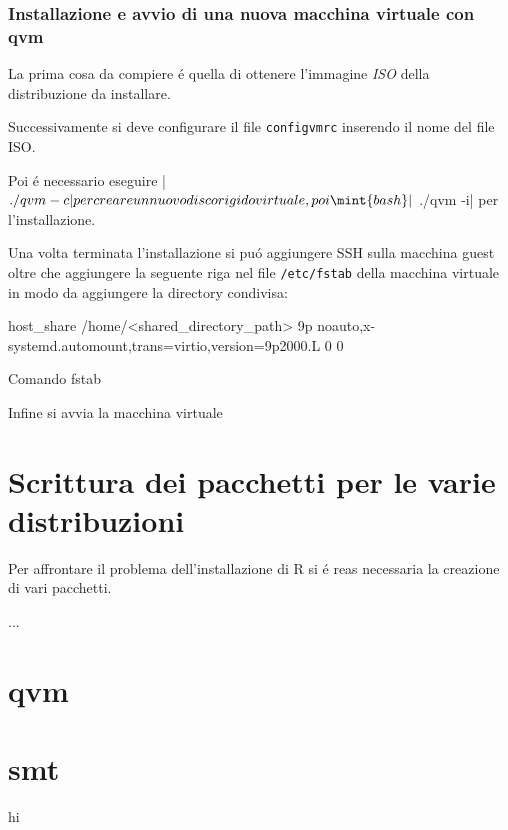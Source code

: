 \documentclass[10pt,titlepage,twoside,a4paper]{report}
\begin{document}
\subsection{Installazione e avvio di una nuova macchina virtuale con qvm}
La prima cosa da compiere \'e quella di ottenere l'immagine \emph{ISO} della 
distribuzione da installare.

Successivamente si deve configurare il file \texttt{configvmrc} inserendo il 
nome del file ISO.

Poi \'e necessario eseguire |$ ./qvm -c| per creare un nuovo 
disco rigido virtuale, poi \mint{bash}|$ ./qvm -i| per l'installazione.

Una volta terminata l'installazione si pu\'o aggiungere SSH sulla macchina 
guest oltre che aggiungere la seguente riga nel file \texttt{/etc/fstab} della 
macchina virtuale in modo da aggiungere la directory condivisa:

\begin{listing}[H]
\begin{textcode*}{}
host_share /home/<shared_directory_path> 9p noauto,x-systemd.automount,trans=virtio,version=9p2000.L 0 0
\end{textcode*}
\caption{Comando fstab}
\end{listing}

Infine si avvia la macchina virtuale

\chapter{Scrittura dei pacchetti per le varie distribuzioni} \label{Scrittura 
dei pacchetti per le varie distribuzioni}
Per affrontare il problema dell'installazione di R si \'e reas necessaria la 
creazione di vari pacchetti.

...

\appendix
\chapter{qvm}

\chapter{smt}
hi



\end{document}
